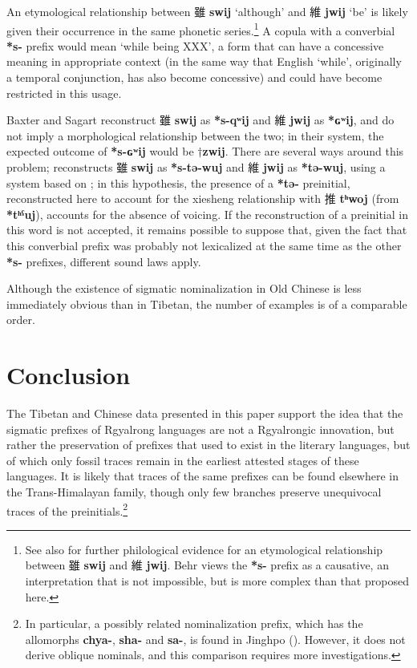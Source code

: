 \documentclass[oneside,a4paper,11pt]{article}
\newcommand{\ipa}[1]{\textbf{{\phon\mbox{#1}}}} %
\newcommand{\zh}[1]{{\cn #1}}
\newcommand{\zhc}[2]{\zh{#1} \ipa{#2}}
\begin{document}
An etymological relationship between \zhc{雖}{swij} `although' and \zhc{維}{jwij} `be' is likely given their occurrence in the same phonetic series.\footnote{See also \citet{behr06counterfactual} for further philological evidence for an etymological relationship between \zhc{雖}{swij} and \zhc{維}{jwij}. Behr views the \ipa{*s-} prefix as a causative, an interpretation that is not impossible, but is more complex than that proposed here. } A copula with a converbial \ipa{*s-} prefix would mean `while being XXX', a form that can have a concessive meaning in appropriate context (in the same way that English `while', originally a temporal conjunction, has also become concessive) and could have become restricted in this usage.

Baxter and Sagart reconstruct \zhc{雖}{swij} as \ipa{*s-qʷij} and \zhc{維}{jwij} as  \ipa{*ɢʷij}, and do not imply a morphological relationship between the two; in their system, the expected outcome of \ipa{*s-ɢʷij} would be $\dagger$\ipa{zwij}. There are several ways around this problem; \citet{jacques00ywij} reconstructs \zhc{雖}{swij} as \ipa{*s-tə-wuj} and  \zhc{維}{jwij} as  \ipa{*tə-wuj}, using a system based on \citet{sagart99roc}; in this hypothesis, the presence of a \ipa{*tə-} preinitial, reconstructed here to account for the xiesheng relationship with \zhc{推}{tʰwoj} (from \ipa{*tʰˁuj}), accounts for the absence of voicing. If the reconstruction of a preinitial in this word is not accepted, it remains possible to suppose that, given the fact that this converbial prefix was probably not lexicalized at the same time as the other \ipa{*s-} prefixes, different sound laws apply.

 Although the existence of sigmatic nominalization in Old Chinese is less immediately obvious than in Tibetan, the number of examples is of a comparable order.

\section{Conclusion}
The Tibetan and Chinese data presented in this paper support the idea that the sigmatic prefixes of Rgyalrong languages are not a Rgyalrongic innovation, but rather the preservation of  prefixes that used to exist in the literary languages, but of which only fossil traces remain in the earliest attested stages of these languages. It is likely that traces of the same prefixes can be found elsewhere in the Trans-Himalayan family, though only few branches preserve unequivocal traces of the preinitials.\footnote{In particular, a possibly related nominalization prefix, which has the allomorphs \ipa{chya-}, \ipa{sha-} and \ipa{sa-}, is found in Jinghpo (\citealt[3-4]{dai90yufa}). However, it does not derive oblique nominals, and this comparison requires more investigations. }
\end{document}
